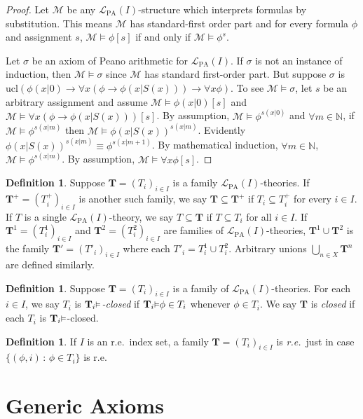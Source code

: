 \documentclass[reqno]{article}
\theoremstyle{definition}
\newtheorem{definition}[theorem]{Definition}
\def\N{\mathbb{N}}
\def\L{\mathscr{L}}
\def\M{\mathscr{M}}
\def\T{\mathbf{T}}
\def\LPA{\L_{\mathrm{PA}}}
\renewcommand{\Pr}[1]{\T_{#1}\mbox{\small${\vDash}$}}
\newcommand{\ucl}[1]{\mathrm{ucl}(#1)}
\begin{document}
\begin{proof}
Let $\M$ be any $\LPA(I)$-structure which interprets formulas by substitution.
This means $\M$ has standard-first order part and for every formula $\phi$
and assignment $s$,
$\M\models \phi[s]$ if and only if $\M\models\phi^s$.

Let $\sigma$ be an axiom of Peano arithmetic for $\LPA(I)$.  If $\sigma$ is not an instance
of induction, then $\M\models\sigma$ since $\M$ has standard first-order part.
But suppose $\sigma$ is $\ucl{\phi(x|0)\rightarrow \forall x(\phi\rightarrow\phi(x|S(x)))\rightarrow\forall x\phi}$.
To see $\M\models\sigma$, let $s$ be an arbitrary assignment and assume
$\M\models\phi(x|0)[s]$ and $\M\models\forall x(\phi\rightarrow \phi(x|S(x)))[s]$.
By assumption, $\M\models\phi^{s(x|0)}$ and $\forall m\in\N$,
if $\M\models \phi^{s(x|m)}$ then $\M\models \phi(x|S(x))^{s(x|m)}$.
Evidently $\phi(x|S(x))^{s(x|m)}\equiv\phi^{s(x|m+1)}$.
By mathematical induction, $\forall m\in\N$, $\M\models\phi^{s(x|m)}$.
By assumption, $\M\models \forall x\phi[s]$.
\end{proof}


\begin{definition}
Suppose $\T=(T_i)_{i\in I}$ is a family $\LPA(I)$-theories.
If $\T^+=(T^+_i)_{i\in I}$ is another such family, we say $\T\subseteq\T^+$
if $T_i\subseteq T^+_i$ for every $i\in I$.
If $T$ is a single $\LPA(I)$-theory,
we say $T\subseteq\T$ if $T\subseteq T_i$ for all $i\in I$.
If $\T^1=(T^1_i)_{i\in I}$ and $\T^2=(T^2_i)_{i\in I}$
are families of $\LPA(I)$-theories, $\T^1\cup\T^2$
is the family $\T'=(T'_i)_{i\in I}$ where each $T'_i=T^1_i\cup T^2_i$.
Arbitrary unions $\bigcup_{n\in X}\T^n$ are defined similarly.
\end{definition}


\begin{definition}
Suppose $\T=(T_i)_{i\in I}$ is a family of $\LPA(I)$-theories.
For each $i\in I$, we say $T_i$ is \emph{$\Pr i$-closed} if
$\Pr i\phi\in T_i$ whenever $\phi\in T_i$.
We say $\T$ is \emph{closed} if each $T_i$ is $\Pr i$-closed.
\end{definition}

\begin{definition}
If $I$ is an r.e.~index set, a family $\T=(T_i)_{i\in I}$ is \emph{r.e.}~just in case
$\{(\phi,i)\,:\,\phi\in T_i\}$ is r.e.
\end{definition}

\section{Generic Axioms}
\label{genericaxiomssection}
\end{document}
